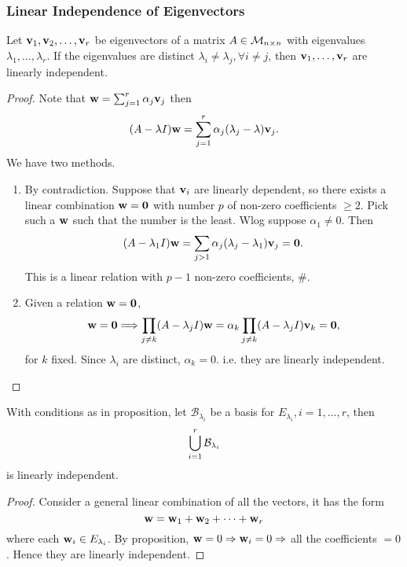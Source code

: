 \documentclass[10pt]{article}
\def\ge{\geqslant}
\begin{document}
    \subsubsection{Linear Independence of Eigenvectors}
    \begin{proposition}\label{prop:eigenvectors linearly independent}
        Let $ {\bf v}_1,{\bf v}_2,\dots, {\bf v}_r $ be eigenvectors of a matrix $A\in {\mathcal{M}}_{n\times n}$ with eigenvalues $ \lambda_1,\dots,\lambda_r $. If the eigenvalues are distinct $ \lambda_i\neq \lambda_j, \forall i\neq j $, then $ {\bf v}_1,\dots,{\bf v}_r $ are linearly independent.
    \end{proposition}
    \begin{proof}
        Note that $ {\bf w}=\sum_{j=1}^{r} \alpha_j {\bf v}_j $ then 
        \[
            (A-\lambda I){\bf w}=\sum_{j=1}^{r} \alpha_j(\lambda_j-\lambda){\bf v}_j
        .\]
        We have two methods.
        \begin{enumerate}[align=hang,label=Method \arabic*.]
            \item By contradiction. Suppose that ${\bf v}_i$ are linearly dependent, so there exists a linear combination $ {\bf w}= \mathbf{0} $ with number $p$ of non-zero coefficients $ \ge 2 $. Pick such a ${\bf w}$ such that the number is the least. Wlog suppose $ \alpha_1 \neq 0$. Then 
            \[
                (A-\lambda_1 I){\bf w}= \sum_{j>1}\alpha_j(\lambda_j-\lambda_1 ){\bf v}_j=\mathbf{0}
            .\]
            This is a linear relation with $p-1$ non-zero coefficients, \#.
            \item Given a relation $ {\bf w}=\mathbf{0} $, 
            \[
                {\bf w}=\mathbf{0} \Longrightarrow \prod_{j\neq k}(A-\lambda_j I){\bf w}=\alpha_k\prod_{j\neq k}(A-\lambda_j I) {\bf v}_k=\mathbf{0}
            ,\]
            for $k$ fixed. Since $ \lambda_i $ are distinct, $ \alpha_k=0 $. i.e. they are linearly independent.
        \end{enumerate}
    \end{proof}
    \begin{corollary}\label{col:basis of all eigenvectors}
            With conditions as in proposition, let $ \mathcal{B}_{\lambda_i} $ be a basis for $ E_{\lambda_i},i=1,\dots,r $, then 
            \[
                \bigcup_{i=1}^{r} {\mathcal{B}}_{\lambda_i}
            \]
            is linearly independent.
    \end{corollary}
    \begin{proof}
        Consider a general linear combination of all the vectors, it has the form 
        \[
            {\bf w}={\bf w}_1+{\bf w}_2+ \cdots +{\bf w}_r
        \]
        where each ${\bf w}_i\in E_{\lambda_i}$. By proposition, $ {\bf w}=0 \Rightarrow {\bf w}_i=0 \Rightarrow  $ all the coefficients $=0$. Hence they are linearly independent.
    \end{proof}
\end{document}
